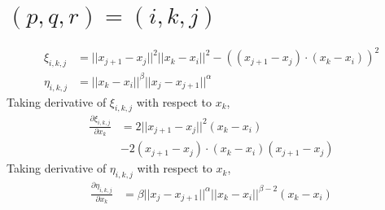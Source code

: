 \documentclass[a4paper]{article}
\newcommand{\norm}[1]{||#1||}
\begin{document}
\section{$(p,q,r) = (i, k, j)$}
\begin{align}
    \xi_{i,k,j} &= \norm{x_{j+1} - x_{j}}^2 \norm{x_k - x_i}^2- \left( \left( x_{j+1} - x_{j} \right) \cdot \left( x_{k} - x_{i} \right) \right)^2 \\
    \eta_{i,k,j} &= \norm{x_k - x_i}^{\beta} \norm{x_{j} - x_{j+1}}^{\alpha}
\end{align}
Taking derivative of $\xi_{i,k,j}$ with respect to $x_k$,
\begin{align}
    \frac{\partial \xi_{i,k,j}}{\partial x_k} &= 2 \norm{x_{j+1} - x_j}^2 \left( x_k - x_i \right) \\
    &- 2 \left( x_{j+1} - x_j \right) \cdot \left( x_k - x_i \right) \left( x_{j+1} - x_j \right)
\end{align}
Taking derivative of $\eta_{i,k,j}$ with respect to $x_k$,
\begin{align}
    \frac{\partial \eta_{i,k,j}}{\partial x_k} &= \beta \norm{x_j - x_{j+1}}^{\alpha} \norm{x_k - x_i}^{\beta - 2} \left( x_k - x_i \right)
\end{align}
\end{document}
